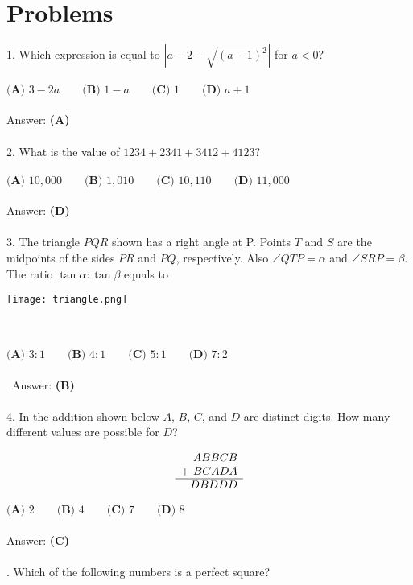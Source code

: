 \documentclass{article}
\begin{document}
\section*{Problems}
1. Which expression is equal to $|a-2-\sqrt{(a-1)^2}|$ for $a<0$? \\\\ 
$\textbf {(A) }  3-2a \qquad \textbf {(B) } 1-a \qquad \textbf {(C) }1\qquad \textbf {(D) } a+1 \qquad $
\\\\ Answer: \textbf {(A) } \\\\ 

2. What is the value of $1234+2341+3412+4123$? \\\\
$\textbf {(A) }  10,000 \qquad \textbf {(B) } 1,010 \qquad \textbf {(C) }10,110\qquad \textbf {(D) }11,000 \qquad $ \\\\
Answer: \textbf {(D) } \\\\

3. The triangle $PQR$ shown has a right angle at P. Points $T$ and $S$ are the midpoints of the sides $PR$ and $PQ$, respectively. Also $\angle QTP = \alpha$ and $\angle SRP = \beta$. The ratio $\tan\alpha : \tan\beta$ equals to \\ \centerline{\texttt{[image: triangle.png]}} \\\\
$\textbf {(A) } 3:1 \qquad \textbf {(B) } 4:1 \qquad \textbf {(C) } 5:1 \qquad \textbf {(D) } 7:2 \qquad$ \\\\\
Answer: \textbf {(B) } \\\\

4. In the addition shown below $A$, $B$, $C$, and $D$ are distinct digits. How many different values are possible for $D$?

\[\begin{array}[t]{r}     ABBCB \\ + \ BCADA \\ \hline     DBDDD \end{array}\]

$\textbf {(A) } 2 \qquad \textbf {(B) } 4 \qquad \textbf {(C) } 7 \qquad \textbf {(D) } 8 \qquad $ \\\\
Answer: \textbf{(C)}\\\\
. Which of the following numbers is a perfect square?
\end{document}
